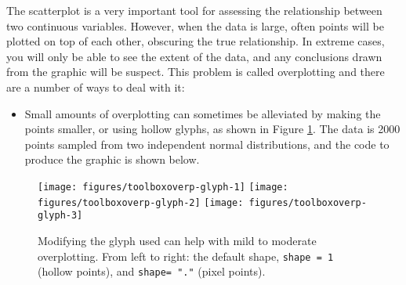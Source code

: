 The scatterplot is a very important tool for assessing the relationship
between two continuous variables. However, when the data is large, often
points will be plotted on top of each other, obscuring the true
relationship. In extreme cases, you will only be able to see the extent
of the data, and any conclusions drawn from the graphic will be suspect.
This problem is called overplotting and there are a number of ways to
deal with it: 

\begin{itemize}
\itemsep1pt\parskip0pt
\item
  Small amounts of overplotting can sometimes be alleviated by making
  the points smaller, or using hollow glyphs, as shown in Figure
  \ref{fig:overp-glyph}. The data is 2000 points sampled from two
  independent normal distributions, and the code to produce the graphic
  is shown below. 
\end{itemize}

\begin{Shaded}
\begin{Highlighting}[]
\StringTok{ }\NormalTok{(} \NormalTok{(}\NormalTok{), } \NormalTok{(}\NormalTok{))}
\StringTok{ }
\StringTok{ }\NormalTok{()}
\StringTok{ }\NormalTok{(} \NormalTok{)}
\StringTok{ }\NormalTok{(} \NormalTok{) }
\end{Highlighting}
\end{Shaded}

\begin{figure}

{\centering \texttt{[image: figures/toolboxoverp-glyph-1]} \texttt{[image: figures/toolboxoverp-glyph-2]} \texttt{[image: figures/toolboxoverp-glyph-3]} 

}

\caption{Modifying the glyph used can help with mild to moderate overplotting.  From left to right: the default shape, \texttt{shape = 1} (hollow points), and \texttt{shape= "."} (pixel points).\label{fig:overp-glyph}}
\end{figure}

